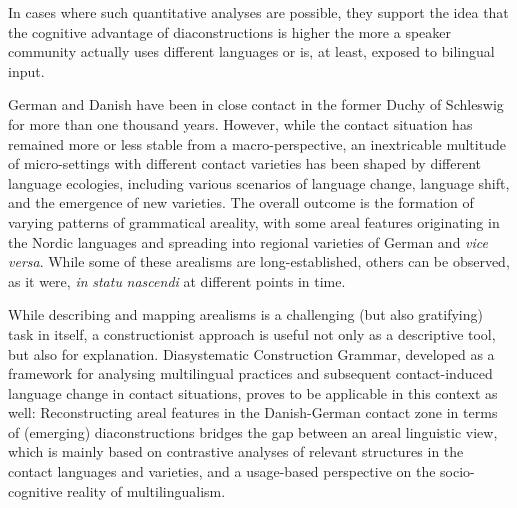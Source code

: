 \documentclass[output=paper]{langsci/langscibook}
\begin{document}
In cases where such quantitative analyses are possible, they support  the idea that the cognitive advantage of diaconstructions is higher the more a speaker community actually uses different languages or is, at least, exposed to bilingual input.


 \label{sec:hoeder:5}


German and Danish have been in close contact in the former Duchy of Schleswig for more than one thousand years. However, while the contact situation has remained more or less stable from a macro-perspective, an inextricable multitude of micro-settings with different contact varieties has been shaped by different language ecologies, including various scenarios of language change, language shift, and the emergence of new varieties. The overall outcome is the formation of varying patterns of grammatical areality, with some areal features originating in the Nordic languages and spreading into regional varieties of German and \textit{vice} \textit{versa}. While some of these arealisms are long-established, others can be observed, as it were, \textit{in} \textit{statu} \textit{nascendi} at different points in time.

While describing and mapping arealisms is a challenging (but also gratifying) task in itself, a constructionist approach is useful not only as a descriptive tool, but also for explanation. Diasystematic Construction Grammar, developed as a framework for analysing multilingual practices and subsequent contact-induced language change in contact situations, proves to be applicable in this context as well: Reconstructing areal features in the Danish-German contact zone in terms of (emerging) diaconstructions bridges the gap between an areal linguistic view, which is mainly based on contrastive analyses of relevant structures in the contact languages and varieties, and a usage-based perspective on the socio-cognitive reality of multilingualism.

{\sloppy\printbibliography[heading=subbibliography,notkeyword=this]}
\end{document}
